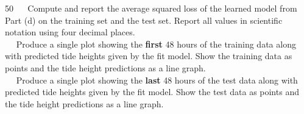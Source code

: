 \documentclass[11pt]{article}
\begin{document}
\begin{problem}{50}
    ~~ Compute and report the average squared loss of the learned model from Part (d) on the training set and the test set. Report all values in scientific notation using four decimal places.\\
    
    ~~ Produce a single plot showing the \textbf{first} 48 hours of the training data along with predicted tide heights given by the fit model. Show the training data as points and the tide height predictions as a line graph.\\
    
    ~~ Produce a single plot showing the \textbf{last} 48 hours of the test data along with predicted tide heights given by the fit model. Show the test data as points and the tide height predictions as a line graph.\\
    
        
\end{problem}


\showpoints
\end{document}
